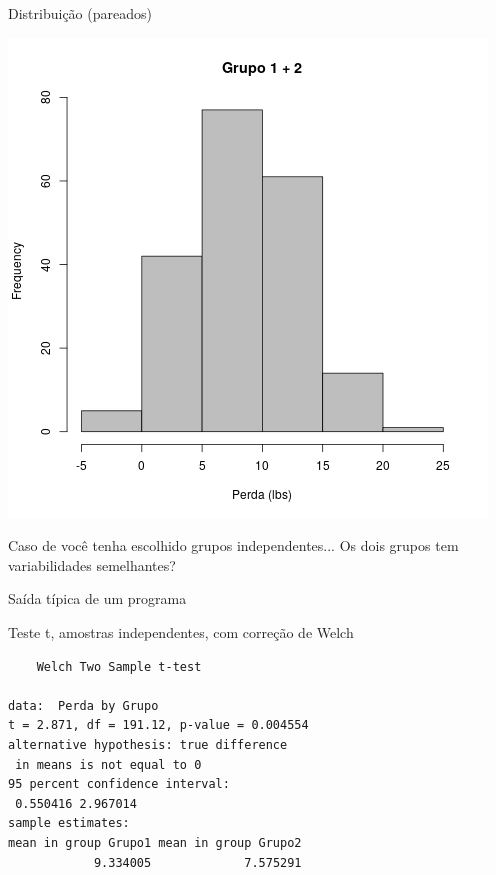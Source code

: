 \documentclass{beamer}
\begin{document}
\begin{frame}{Distribuição (pareados)}
  \begin{center}
    \includegraphics[height=\textheight]{Cap23-25/obesidade-hist1}
  \end{center}
\end{frame}

\begin{frame}
  \begin{block}{Caso de você tenha escolhido grupos independentes...}
    Os dois grupos tem variabilidades semelhantes?
  \end{block}
\end{frame}


\begin{frame}[fragile]{Saída típica de um programa}
  \begin{block}{Teste t, amostras independentes, com correção de Welch}
    \footnotesize
\begin{verbatim}
	Welch Two Sample t-test

data:  Perda by Grupo
t = 2.871, df = 191.12, p-value = 0.004554
alternative hypothesis: true difference
 in means is not equal to 0
95 percent confidence interval:
 0.550416 2.967014
sample estimates:
mean in group Grupo1 mean in group Grupo2 
            9.334005             7.575291
\end{verbatim}
  \end{block}
\end{frame}
\end{document}
